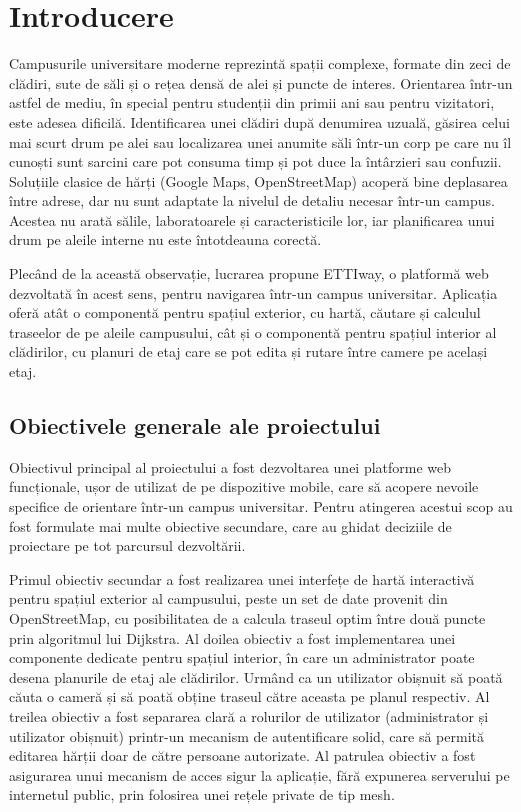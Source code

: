 ﻿\documentclass[12pt, a4paper, twoside, romanian]{teza-upb}
\begin{document}
\afterpreface
\pagestyle{plain}
 
\chapter*{Introducere}
 
Campusurile universitare moderne reprezintă spații complexe, formate din zeci
de clădiri, sute de săli și o rețea densă de alei și puncte de interes.
Orientarea într-un astfel de mediu, în special pentru studenții din primii ani
sau pentru vizitatori, este adesea dificilă. Identificarea unei clădiri după
denumirea uzuală, găsirea celui mai scurt drum pe alei sau localizarea unei
anumite săli într-un corp pe care nu îl cunoști sunt sarcini care pot consuma
timp și pot duce la întârzieri sau confuzii. Soluțiile clasice de hărți
(Google Maps, OpenStreetMap) acoperă bine deplasarea între adrese, dar nu sunt
adaptate la nivelul de detaliu necesar într-un campus. Acestea nu arată sălile,
laboratoarele și caracteristicile lor, iar planificarea unui drum pe aleile
interne nu este întotdeauna corectă.
 
Plecând de la această observație, lucrarea propune ETTIway, o platformă web
dezvoltată în acest sens, pentru navigarea într-un campus universitar.
Aplicația oferă atât o componentă pentru spațiul exterior, cu hartă, căutare
și calculul traseelor de pe aleile campusului, cât și o componentă pentru spațiul
interior al clădirilor, cu planuri de etaj care se pot edita și rutare între camere
pe același etaj.
 
\section{Obiectivele generale ale proiectului}
\label{sec:intro-obiective}
 
Obiectivul principal al proiectului a fost dezvoltarea unei platforme web
funcționale, ușor de utilizat de pe dispozitive mobile, care să acopere
nevoile specifice de orientare într-un campus universitar. Pentru atingerea
acestui scop au fost formulate mai multe obiective secundare, care au
ghidat deciziile de proiectare pe tot parcursul dezvoltării.
 
Primul obiectiv secundar a fost realizarea unei interfețe de hartă interactivă
pentru spațiul exterior al campusului, peste un set de date provenit din
OpenStreetMap, cu posibilitatea de a calcula traseul optim între două puncte
prin algoritmul lui Dijkstra. Al doilea obiectiv a fost implementarea unei
componente dedicate pentru spațiul interior, în care un administrator poate
desena planurile de etaj ale clădirilor. Urmând ca un utilizator obișnuit să poată
căuta o cameră și să poată obține traseul către aceasta pe planul respectiv.
Al treilea obiectiv a fost separarea clară a rolurilor de utilizator
(administrator și utilizator obișnuit) printr-un mecanism de autentificare
solid, care să permită editarea hărții doar de către persoane autorizate.
Al patrulea obiectiv a fost asigurarea unui mecanism de acces sigur la
aplicație, fără expunerea serverului pe internetul public, prin folosirea
unei rețele private de tip mesh.
 
\end{document}
